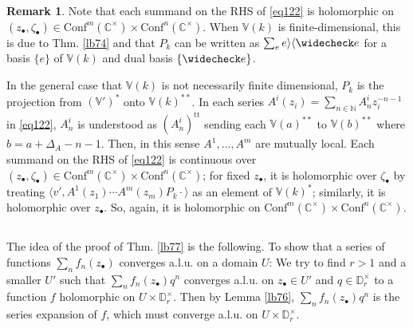 \documentclass[12pt,a4paper,notitlepage]{article}
\theoremstyle{definition}
\newtheorem{rem}[df]{Remark}
\theoremstyle{plain}
\newcommand{\wch}{\widecheck}
\newcommand{\tr}{\mathrm{t}} %
\newcommand{\Conf}{\mathrm{Conf}}
\newcommand{\bk}[1]{\langle {#1}\rangle}
\newcommand{\blt}{\bullet}
\newcommand{\Vbb}{\mathbb V}
\newcommand{\Cbb}{\mathbb C}
\newcommand{\Nbb}{\mathbb N}
\newcommand{\Dbb}{\mathbb D}
\numberwithin{equation}{section}
\begin{document}
\begin{rem}
Note that each summand on the RHS of \eqref{eq122} is holomorphic on $(z_\blt,\zeta_\blt)\in\Conf^m(\Cbb^\times)\times\Conf^n(\Cbb^\times)$. When $\Vbb(k)$ is finite-dimensional, this is due to Thm. \ref{lb74} and that $P_k$ can be written as $\sum_e e\rangle\langle\wch e$ for a basis $\{e\}$ of $\Vbb(k)$ and dual basis $\{\wch e\}$. 

In the general case that $\Vbb(k)$ is not necessarily finite dimensional, $P_k$ is the projection from $(\Vbb')^*$ onto $\Vbb(k)^{**}$. In each series $A^i(z_i)=\sum_{n\in\Nbb}A^i_nz_i^{-n-1}$ in \eqref{eq122}, $A^i_n$ is understood as $(A^i_n)^{\tr\tr}$ sending each $\Vbb(a)^{**}$ to $\Vbb(b)^{**}$ where $b=a+\Delta_A-n-1$. Then, in this sense $A^1,\dots,A^m$ are mutually local. Each summand on the RHS of \eqref{eq122} is continuous over $(z_\blt,\zeta_\blt)\in\Conf^m(\Cbb^{\times})\times\Conf^n(\Cbb^\times)$; for fixed $z_\blt$, it is holomorphic over $\zeta_\blt$ by treating $\bk{v',A^1(z_1)\cdots A^m(z_m)P_k\cdot}$ as an element of $\Vbb(k)^*$; similarly, it is holomorphic over $z_\blt$. So, again, it is holomorphic on $\Conf^m(\Cbb^\times)\times\Conf^n(\Cbb^\times)$.
\end{rem}


\subsection{}


The idea of the proof of Thm. \ref{lb77} is the following. To show that a series of functions $\sum_n f_n(z_\blt)$ converges a.l.u. on a domain $U$: We try to find $r>1$ and a smaller $U'$ such that $\sum_n f_n(z_\blt)q^n$ converges a.l.u. on $z_\blt\in U'$ and $q\in\Dbb_r^\times$ to a function $f$ holomorphic on $U\times\Dbb_r^\times$. Then by Lemma \ref{lb76}, $\sum_n f_n(z_\blt)q^n$ is the series expansion of $f$, which must converge a.l.u. on $U\times\Dbb_r^\times$. 
\end{document}
